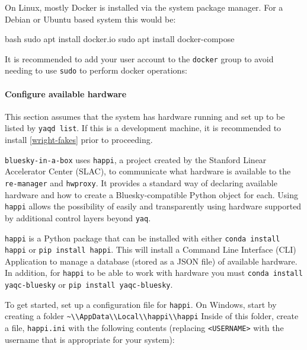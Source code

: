 On Linux, mostly Docker is installed via the system package manager.
For a Debian or Ubuntu based system this would be:

\begin{codefragment}{bash}
sudo apt install docker.io
sudo apt install docker-compose
\end{codefragment}

It is recommended to add your user account to the \texttt{docker} group to avoid needing to use \texttt{sudo} to perform docker operations:


\paragraph{Configure available \yaq{} hardware}

This section assumes that the system has \yaq{} hardware running and set up to be listed by \texttt{yaqd list}.
If this is a development machine, it is recommended to install \ref{wright-fakes} prior to proceeding.

\texttt{bluesky-in-a-box} uses \texttt{happi}\cite{}, a project created by the Stanford Linear Accelerator Center (SLAC), to communicate what hardware is available to the \texttt{re-manager} and \texttt{hwproxy}.
It provides a standard way of declaring available hardware and how to create a Bluesky-compatible Python object for each.
Using \texttt{happi} allows the possibility of easily and transparently using hardware supported by additional control layers beyond \texttt{yaq}.

\texttt{happi} is a Python package that can be installed with either \texttt{conda install happi} or \texttt{pip install happi}.
This will install a Command Line Interface (CLI) Application to manage a database (stored as a JSON file) of available hardware.
In addition, for \texttt{happi} to be able to work with \yaq{} hardware you must \texttt{conda install yaqc-bluesky} or \texttt{pip install yaqc-bluesky}.

To get started, set up a configuration file for \texttt{happi}.
On Windows, start by creating a folder \nolinkurl{~\\AppData\\Local\\happi\\happi}
Inside of this folder, create a file, \nolinkurl{happi.ini} with the following contents (replacing \texttt{<USERNAME>} with the username that is appropriate for your system):

